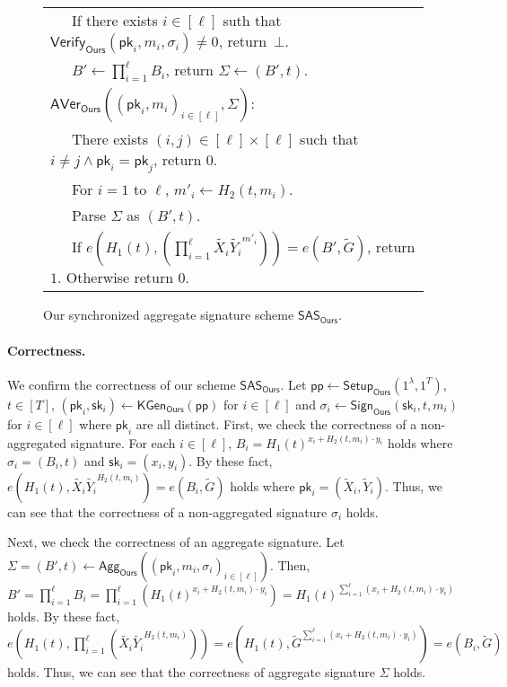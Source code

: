 \documentclass[a4paper,11pt]{fullverllncs}
\newcommand{\Ours}{\mathsf{Ours}}
\newcommand{\sk}{\mathsf{sk}}
\newcommand{\pk}{\mathsf{pk}}
\newcommand{\pp}{\mathsf{pp}}
\newcommand{\Setup}{\mathsf{Setup}}
\newcommand{\KGen}{\mathsf{KGen}}
\newcommand{\Sign}{\mathsf{Sign}}
\newcommand{\Verify}{\mathsf{Verify}}
\newcommand{\Agg}{\mathsf{Agg}}
\newcommand{\AVer}{\mathsf{AVer}}
\newcommand{\SAS}{\mathsf{SAS}}
\begin{document}
\begin{figure}[h]
\begin{tabular}{|l|}
~~~If there exists $i \in [\ell]$ suth that $\Verify_{\Ours} (\pk_i, m_i, \sigma_i) \neq 0$, return~$\bot$.\\
~~~$B' \leftarrow \prod^{\ell}_{i=1} B_i$, return $\Sigma \leftarrow (B', t)$.\\
$\AVer_{\Ours} ((\pk_i, m_i)_{i \in [\ell]}, \Sigma):$\\
~~~There exists $(i, j) \in [\ell]\times [\ell]$ such that $i \neq j \land \pk_i = \pk_j$, return $0$.\\
~~~For $i= 1$ to $\ell$, $m'_i \leftarrow H_2(t, m_i)$.\\
~~~Parse $\Sigma$ as $(B', t)$.\\
~~~If $e(H_1(t), (\prod^{\ell}_{i=1}\widetilde{X_i}\widetilde{Y_i}^{m'_i})) = e(B', \widetilde{G})$, return $1$. Otherwise return $0$.\\
\hline
\end{tabular}
\caption{\small
Our synchronized aggregate signature scheme $\SAS_{\Ours}$. }
\label{PSASsigconst}
\end{figure}


\paragraph{\bf Correctness.}
We confirm the correctness of our scheme $\SAS_{\Ours}$. 
Let $\pp \leftarrow \Setup_{\Ours} (1^\lambda, 1^{T})$, $t \in [T]$, $(\pk_i, \sk_i) \leftarrow \KGen_{\Ours} (\pp)$ for $i \in [\ell]$ and $\sigma_i \leftarrow \Sign_{\Ours} (\sk_i, t, m_i)$ for $i \in [\ell]$ where $\pk_i$ are all distinct.
First, we check the correctness of a non-aggregated signature.
For each $i \in [\ell]$,   $B_i = H_1(t)^{x_i +  H_2(t,m_i) \cdot y_i}$ holds where $\sigma_i = (B_i, t)$ and $\sk_i = (x_i, y_i)$.
By these fact, $e(H_1(t), \widetilde{X_i}\widetilde{Y_i}^{H_2(t,m_i)}) = e(B_i, \widetilde{G})$ holds where $\pk_i = (\widetilde{X}_i, \widetilde{Y}_i)$.
Thus, we can see that the correctness of a non-aggregated signature $\sigma_i$ holds. 

Next, we check the correctness of an aggregate signature.
Let $\Sigma = (B', t) \leftarrow \Agg_{\Ours} ((\pk_i, m_i, \sigma_i)_{i \in [\ell]})$.
Then, $B' = \prod^{\ell}_{i=1} B_i = \prod^{\ell}_{i=1}(H_1(t)^{x_i +  H_2(t,m_i) \cdot y_i}) = H_1(t)^{\sum^{\ell}_{i=1}(x_i +  H_2(t,m_i) \cdot y_i)}$ holds.
By these fact, $e(H_1(t), \prod^{\ell}_{i=1}(\widetilde{X_i}\widetilde{Y_i}^{H_2(t,m_i)})) =  e(H_1(t), \widetilde{G}^{\sum^{\ell}_{i=1}(x_i + H_2(t,m_i) \cdot y_i)})  = e(B_i, \widetilde{G})$ holds.
Thus, we can see that the correctness of aggregate signature $\Sigma$ holds.
\end{document}

